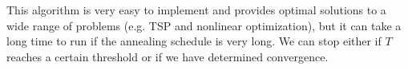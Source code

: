   This algorithm is very easy to implement and provides optimal solutions to a wide range of problems (e.g. TSP and nonlinear optimization), but it can take a long time to run if the annealing schedule is very long. We can stop either if $T$ reaches a certain threshold or if we have determined convergence. 

